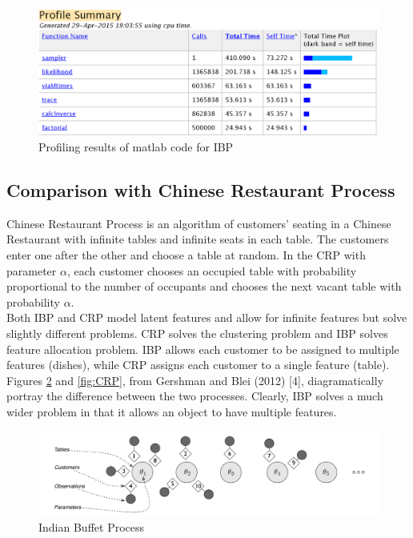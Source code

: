 \documentclass[11pt]{article}
\begin{document}
\begin{figure}
\includegraphics[width=\linewidth]{matlab_profile.png}
\caption {Profiling results of matlab code for IBP}
\label{fig:matlab}
\end{figure}

\subsection{Comparison with Chinese Restaurant Process}
Chinese Restaurant Process is an algorithm of customers’ seating in a Chinese Restaurant with infinite tables and infinite seats in each table. The customers enter one after the other and choose a table at random. In the CRP with parameter $\alpha$, each customer chooses an occupied table with probability proportional to the number of occupants and chooses the next vacant table with probability $\alpha$.\\

Both IBP and CRP model latent features and allow for infinite features but solve slightly different problems. CRP solves the clustering problem and IBP solves feature allocation problem. IBP allows each customer to be assigned to multiple features (dishes), while
CRP assigns each customer to a single feature (table). Figures \ref{fig:IBP} and \ref{fig:CRP}, from Gershman and Blei (2012) [4], diagramatically portray the difference between the two processes. Clearly, IBP solves a much wider problem in that it allows an object to have multiple features.

\begin{figure}
\includegraphics[width=\linewidth]{IBP.png}
\caption {Indian Buffet Process}
\label{fig:IBP}
\end{figure}
\end{document}
